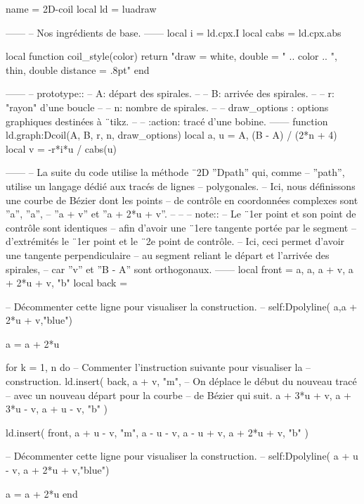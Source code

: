 \documentclass[varwidth]{standalone}
\begin{document}
\begin{luadraw*}{name = 2D-coil}
local ld = luadraw

------
-- Nos ingrédients de base.
------
local i    = ld.cpx.I
local cabs = ld.cpx.abs

local function coil_style(color)
  return "draw = white, double = " .. color
      .. ", thin, double distance = .8pt"
end

------
-- prototype::
--     A: départ des spirales.
--
--     B: arrivée des spirales.
--
--     r: "rayon" d'une boucle
--
--     n: nombre de spirales.
--
--     draw_options : options graphiques destinées à ¨tikz.
--
--     :action: tracé d'une bobine.
------
function ld.graph:Dcoil(A, B, r, n, draw_options)
  local a, u = A, (B - A) / (2*n + 4)
  local v    = -r*i*u / cabs(u)

------
-- La suite du code utilise la méthode ¨2D ''Dpath'' qui, comme
-- ''path'', utilise un langage dédié aux tracés de lignes
-- polygonales.
-- Ici, nous définissons une courbe de Bézier dont les points
-- de contrôle en coordonnées complexes sont ''a'', ''a'',
-- ''a + v'' et ''a + 2*u + v''.
--
--
-- note::
--     Le ¨1er point et son point de contrôle sont identiques
--     afin d'avoir une ¨1ere tangente portée par le segment
--     d'extrémités le ¨1er point et le ¨2e point de contrôle.
--     Ici, ceci permet d'avoir une tangente perpendiculaire
--     au segment reliant le départ et l'arrivée des spirales,
--     car ''v'' et ''B - A'' sont orthogonaux.
------
  local front = {a, a, a + v, a + 2*u + v, "b"}
  local back  = {}

-- Décommenter cette ligne pour visualiser la construction.
--  self:Dpolyline( {a,a + 2*u + v},"blue")

  a = a + 2*u

  for k = 1, n do
-- Commenter l'instruction suivante pour visualiser la
-- construction.
    ld.insert(
      back,
      {
        a + v, "m", -- On déplace le début du nouveau tracé
                    -- avec un nouveau départ pour la courbe
                    -- de Bézier qui suit.
        a + 3*u + v, a + 3*u - v, a + u - v, "b"
      }
    )

    ld.insert(
      front,
      {
        a + u - v, "m",
        a - u - v, a - u + v, a + 2*u + v, "b"
      }
    )

-- Décommenter cette ligne pour visualiser la construction.
--    self:Dpolyline( {a + u - v, a + 2*u + v},"blue")

    a = a + 2*u
  end


\end{luadraw*}
\end{document}
